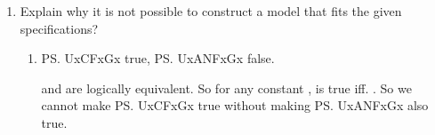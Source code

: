 \begin{enumerate}
\begin{enumerate}
{	Referent of constants:  refers to Ash,  refers to Beck.

	Extension of : . 

	Extension of :  and .

   }
 
  \item \ps{XxFx} true, \ps{UxGx} false.


  \item \ps{XxFx} false, \ps{UxGx} true.


  \item \ps{CXxFxUxGx} false.

 \end{enumerate}

\newpage

\item Explain why it is not possible to construct a model that fits the given 
 specifications?
 \begin{enumerate}
 \cover{\setlength{\itemsep}{2em}}

  \item  \ps{UxCFxGx} true, \ps{UxANFxGx} false.

   \opts{
	\dotline
	\dotline
	\dotline
	\dotline
	\dotline
	\dotline
   }
   {
	 and  are logically equivalent. So for any constant \p{\kappa}, 
	 is true iff. .  
	So we cannot make \ps{UxCFxGx} true without making \ps{UxANFxGx} also true.
   }





\end{enumerate}
\end{enumerate}

